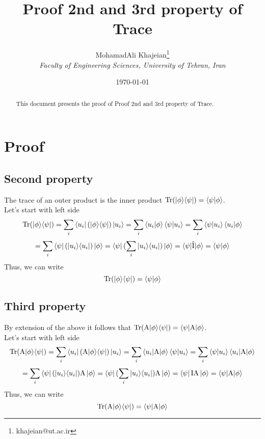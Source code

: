 \documentclass[12pt]{article}
\title{\textbf{Proof 2nd and 3rd property of Trace}}
\author{
    MohamadAli Khajeian\footnote{khajeian@ut.ac.ir} \\ 
    \small \textit{Faculty of Engineering Sciences, University of Tehran, Iran} \\ 
}
\date{\today}
\begin{document}
\maketitle

\begin{abstract}
    This document presents the proof of Proof 2nd and 3rd property of Trace.
\end{abstract}

\section*{Proof}

\subsection*{Second property}
The trace of an outer product is the inner product $\textnormal{Tr}(|\phi\rangle \langle \psi|) = \braket{\psi | \phi}$.
\\Let's start with left side
\begin{equation*}
    \textnormal{Tr}(|\phi\rangle \langle \psi|) = \sum_{i} \bra{u_{i}}(|\phi\rangle \langle \psi|)\ket{u_{i}} = \sum_{i} \braket{u_{i} | \phi} \braket{\psi | u_{i}} = \sum_{i} \braket{\psi | u_{i}} \braket{u_{i} | \phi}
\end{equation*}
\begin{equation*}
    = \sum_{i} \bra{\psi}(|u_{i}\rangle \langle u_{i}|)\ket{\phi} = \bra{\psi}( \sum_{i} |u_{i}\rangle \langle u_{i}|)\ket{\phi} = \braket{\psi | \hat{\textnormal{I}} | \phi} = \braket{\psi | \phi}
\end{equation*}
Thus, we can write
\begin{equation*}
    \textnormal{Tr}(|\phi\rangle \langle \psi|) = \braket{\psi | \phi}
\end{equation*}
\subsection*{Third property}
By extension of the above it follows that $\textnormal{Tr}(\textnormal{A}|\phi\rangle \langle \psi|) = \braket{\psi | \textnormal{A} | \phi}$.
\\Let's start with left side
\begin{equation*}
    \textnormal{Tr}(\textnormal{A}|\phi\rangle \langle \psi|) = \sum_{i} \bra{u_{i}}(\textnormal{A}|\phi\rangle \langle \psi|)\ket{u_{i}} = \sum_{i} \braket{u_{i} | \textnormal{A} | \phi} \braket{\psi | u_{i}} = \sum_{i} \braket{\psi | u_{i}} \braket{u_{i} | \textnormal{A} | \phi}
\end{equation*}
\begin{equation*}
    = \sum_{i} \bra{\psi}(|u_{i}\rangle \langle u_{i}|)\textnormal{A}\ket{\phi} = \bra{\psi}(\sum_{i}|u_{i}\rangle \langle u_{i}|)\textnormal{A}\ket{\phi} = \bra{\psi}\textnormal{I}\textnormal{A}\ket{\phi} = \braket{\psi | \textnormal{A} | \phi}
\end{equation*}
Thus, we can write
\begin{equation*}
    \textnormal{Tr}(\textnormal{A}|\phi\rangle \langle \psi|) = \braket{\psi | \textnormal{A} | \phi}
\end{equation*}
\end{document}
